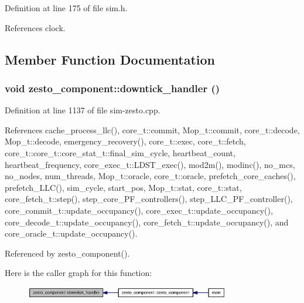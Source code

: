 Definition at line 175 of file sim.h.

References clock.

\subsection{Member Function Documentation}
\subsubsection[{downtick\_\-handler}]{\setlength{\rightskip}{0pt plus 5cm}void zesto\_\-component::downtick\_\-handler ()}\label{classzesto__component_14b525d106d3d5e07baa194738c1db1b}




Definition at line 1137 of file sim-zesto.cpp.

References cache\_\-process\_\-llc(), core\_\-t::commit, Mop\_\-t::commit, core\_\-t::decode, Mop\_\-t::decode, emergency\_\-recovery(), core\_\-t::exec, core\_\-t::fetch, core\_\-t::core\_\-t::core\_\-stat\_\-t::final\_\-sim\_\-cycle, heartbeat\_\-count, heartbeat\_\-frequency, core\_\-exec\_\-t::LDST\_\-exec(), mod2m(), modinc(), no\_\-mcs, no\_\-nodes, num\_\-threads, Mop\_\-t::oracle, core\_\-t::oracle, prefetch\_\-core\_\-caches(), prefetch\_\-LLC(), sim\_\-cycle, start\_\-pos, Mop\_\-t::stat, core\_\-t::stat, core\_\-fetch\_\-t::step(), step\_\-core\_\-PF\_\-controllers(), step\_\-LLC\_\-PF\_\-controller(), core\_\-commit\_\-t::update\_\-occupancy(), core\_\-exec\_\-t::update\_\-occupancy(), core\_\-decode\_\-t::update\_\-occupancy(), core\_\-fetch\_\-t::update\_\-occupancy(), and core\_\-oracle\_\-t::update\_\-occupancy().

Referenced by zesto\_\-component().

Here is the caller graph for this function:\nopagebreak
\begin{figure}[H]
\begin{center}
\leavevmode
\includegraphics[width=253pt]{classzesto__component_14b525d106d3d5e07baa194738c1db1b_icgraph}
\end{center}
\end{figure}
